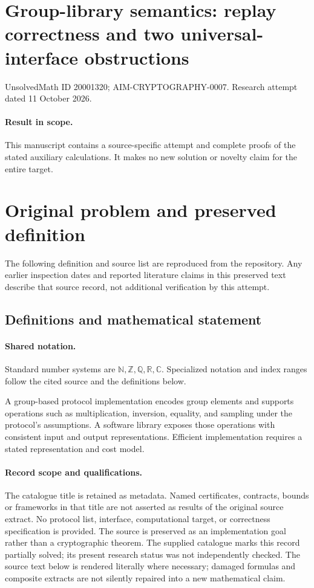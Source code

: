 \documentclass[11pt]{article}
\begin{document}
\section*{Group-library semantics: replay correctness and two universal-interface obstructions}
\noindent UnsolvedMath ID 20001320; AIM-CRYPTOGRAPHY-0007. Research attempt dated 11 October 2026.
\paragraph{Result in scope.}This manuscript contains a source-specific attempt and complete proofs of the stated auxiliary calculations. It makes no new solution or novelty claim for the entire target.
\section{Original problem and preserved definition}
The following definition and source list are reproduced from the repository. Any earlier inspection dates and reported literature claims in this preserved text describe that source record, not additional verification by this attempt.
\subsection{Definitions and mathematical statement}

\paragraph{Shared notation.}Standard number systems are $\mathbb N,\mathbb Z,\mathbb Q,\mathbb R,\mathbb C$. Specialized notation and index ranges follow the cited source and the definitions below.


A group-based protocol implementation encodes group elements and supports operations such as multiplication, inversion, equality, and sampling under the protocol's assumptions. A software library exposes those operations with consistent input and output representations. Efficient implementation requires a stated representation and cost model.
\paragraph{Record scope and qualifications.}
The catalogue title is retained as metadata. Named certificates, contracts, bounds or frameworks in that title are not asserted as results of the original source extract.
No protocol list, interface, computational target, or correctness specification is provided. The source is preserved as an implementation goal rather than a cryptographic theorem. The supplied catalogue marks this record partially solved; its present research status was not independently checked.
The source text below is rendered literally where necessary; damaged formulas and composite extracts are not silently repaired into a new mathematical claim.
\end{document}
